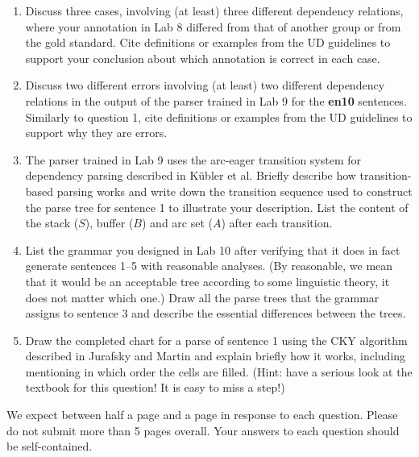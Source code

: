 \documentclass[11pt]{article}
\begin{document}
\begin{enumerate}[itemsep=3pt]
\item Discuss three cases, involving (at least) three different dependency relations, where your annotation in Lab 8 differed from that of another group or from the gold standard.  Cite definitions or examples from the UD guidelines to support your conclusion about which annotation is correct in each case. 
\item Discuss two different errors involving (at least) two different dependency relations in the output of the parser trained in Lab 9 for the \textbf{en10} sentences. Similarly to question 1, cite definitions or examples from the UD guidelines to support why they are errors.
\item The parser trained in Lab 9 uses the arc-eager transition system for dependency parsing described in K\"{u}bler et al. Briefly describe how transition-based parsing works and write down the transition sequence used to construct the parse tree for sentence 1 to illustrate your description. List the content of the stack ($S$), buffer ($B$) and arc set ($A$) after each transition. 
\item List the grammar you designed in Lab 10 after verifying that it does in fact generate sentences 1--5 with reasonable analyses. (By reasonable, we mean that it would be an acceptable tree according to some linguistic theory, it does not matter which one.) Draw all the parse trees that the grammar assigns to sentence 3 and describe the essential differences between the trees. 
\item Draw the completed chart for a parse of sentence 1 using the CKY algorithm described in Jurafsky and Martin and explain briefly how it works, including mentioning in which order the cells are filled. (Hint: have a serious look at the textbook for this question! It is easy to miss a step!) 
\end{enumerate}

We expect between half a page and a page in response to each question. Please do not submit more than 5 pages overall. 
Your answers to each question should be self-contained.
\end{document}
